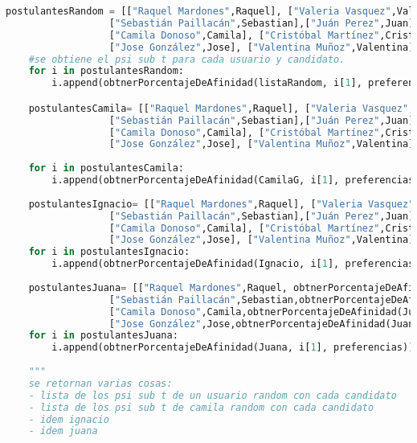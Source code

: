 \documentclass[a4paper]{article}
\begin{document}
\begin{lstlisting}[language=Python]
    postulantesRandom = [["Raquel Mardones",Raquel], ["Valeria Vasquez",Valeria], 
                  ["Sebastián Paillacán",Sebastian],["Juán Perez",Juan],
                  ["Camila Donoso",Camila], ["Cristóbal Martínez",Cristobal], 
                  ["Jose González",Jose], ["Valentina Muñoz",Valentina]]
    #se obtiene el psi sub t para cada usuario y candidato. 
    for i in postulantesRandom:
        i.append(obtnerPorcentajeDeAfinidad(listaRandom, i[1], preferencias))

    postulantesCamila= [["Raquel Mardones",Raquel], ["Valeria Vasquez",Valeria], 
                  ["Sebastián Paillacán",Sebastian],["Juán Perez",Juan],
                  ["Camila Donoso",Camila], ["Cristóbal Martínez",Cristobal], 
                  ["Jose González",Jose], ["Valentina Muñoz",Valentina]]
    
    for i in postulantesCamila:
        i.append(obtnerPorcentajeDeAfinidad(CamilaG, i[1], preferencias))
    
    postulantesIgnacio= [["Raquel Mardones",Raquel], ["Valeria Vasquez",Valeria], 
                  ["Sebastián Paillacán",Sebastian],["Juán Perez",Juan],
                  ["Camila Donoso",Camila], ["Cristóbal Martínez",Cristobal], 
                  ["Jose González",Jose], ["Valentina Muñoz",Valentina]]
    for i in postulantesIgnacio:
        i.append(obtnerPorcentajeDeAfinidad(Ignacio, i[1], preferencias))
    
    postulantesJuana= [["Raquel Mardones",Raquel, obtnerPorcentajeDeAfinidad(Juana,Raquel,preferencias)], ["Valeria Vasquez",Valeria, obtnerPorcentajeDeAfinidad(Juana,Valeria,preferencias)], 
                  ["Sebastián Paillacán",Sebastian,obtnerPorcentajeDeAfinidad(Juana,Sebastian,preferencias)],["Juán Perez",Juan,obtnerPorcentajeDeAfinidad(Juana,Juan,preferencias)],
                  ["Camila Donoso",Camila,obtnerPorcentajeDeAfinidad(Juana,Camila,preferencias)], ["Cristóbal Martínez",Cristobal,obtnerPorcentajeDeAfinidad(Juana,Cristobal,preferencias)], 
                  ["Jose González",Jose,obtnerPorcentajeDeAfinidad(Juana,Jose,preferencias)], ["Valentina Muñoz",Valentina,obtnerPorcentajeDeAfinidad(Juana,Valentina,preferencias)]]
    for i in postulantesJuana:
        i.append(obtnerPorcentajeDeAfinidad(Juana, i[1], preferencias))
                 
    """
    se retornan varias cosas:
    - lista de los psi sub t de un usuario random con cada candidato
    - lista de los psi sub t de camila random con cada candidato
    - idem ignacio
    - idem juana
    

\end{lstlisting}
\end{document}
